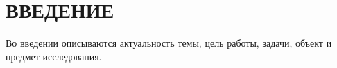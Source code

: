 \section*{ВВЕДЕНИЕ}

Во введении описываются актуальность темы, цель работы, задачи, объект и предмет исследования.
